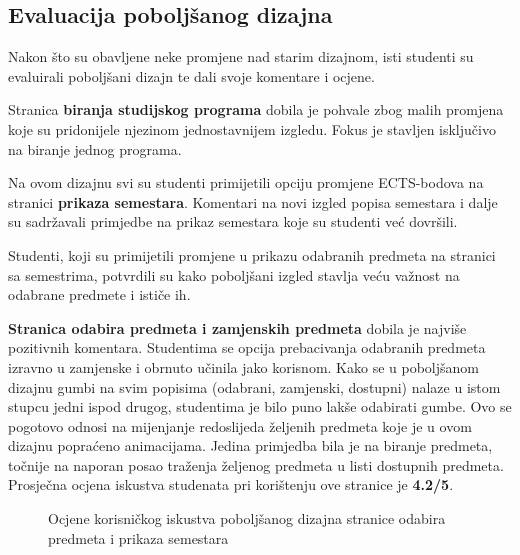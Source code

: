 \documentclass[times, utf8, zavrsni, numeric]{fer}
\begin{document}
        \subsection{Evaluacija poboljšanog dizajna}
        Nakon što su obavljene neke promjene nad starim dizajnom, isti studenti su evaluirali poboljšani dizajn te dali svoje komentare i ocjene.
        
        Stranica \textbf{biranja studijskog programa} dobila je pohvale zbog malih promjena koje su pridonijele njezinom jednostavnijem izgledu. Fokus je stavljen isključivo na biranje jednog programa.
        
        Na ovom dizajnu svi su studenti primijetili opciju promjene ECTS-bodova na stranici \textbf{prikaza semestara}. Komentari na novi izgled popisa semestara i dalje su sadržavali primjedbe na prikaz semestara koje su studenti već dovršili.
        
        Studenti, koji su primijetili promjene u prikazu odabranih predmeta na stranici sa semestrima, potvrdili su kako poboljšani izgled stavlja veću važnost na odabrane predmete i ističe ih.
        
        \textbf{Stranica odabira predmeta i zamjenskih predmeta} dobila je najviše pozitivnih komentara. Studentima se opcija prebacivanja odabranih predmeta izravno u zamjenske i obrnuto učinila jako korisnom. Kako se u poboljšanom dizajnu gumbi na svim popisima (odabrani, zamjenski, dostupni) nalaze u istom stupcu jedni ispod drugog, studentima je bilo puno lakše odabirati gumbe. Ovo se pogotovo odnosi na mijenjanje redoslijeda željenih predmeta koje je u ovom dizajnu popraćeno animacijama. Jedina primjedba bila je na biranje predmeta, točnije na naporan posao traženja željenog predmeta u listi dostupnih predmeta. Prosječna ocjena iskustva studenata pri korištenju ove stranice je \textbf{4.2/5}.
        
        \begin{figure} [H]
          \centering
          \caption{Ocjene korisničkog iskustva poboljšanog dizajna stranice odabira predmeta i prikaza semestara}
        \end{figure}
        
\end{document}
